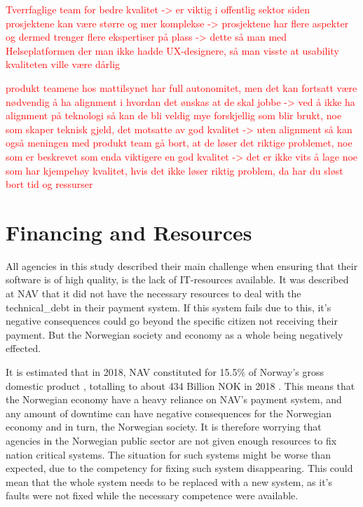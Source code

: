 \textcolor{red}{Tverrfaglige team  for bedre kvalitet -> er viktig i offentlig sektor siden prosjektene kan være større og mer komplekse -> prosjektene har flere aspekter og dermed trenger flere ekspertiser på plass -> dette så man med Helseplatformen der man ikke hadde UX-designere, så man visste at usability kvaliteten ville være dårlig}

\textcolor{red}{produkt teamene hos mattilsynet har full autonomitet, men det kan fortsatt være nødvendig å ha alignment i hvordan det ønskas at de skal jobbe -> ved å ikke ha alignment på teknologi så kan de bli veldig mye forskjellig som blir brukt, noe som skaper teknisk gjeld, det motsatte av god kvalitet -> uten alignment så kan også meningen med produkt team gå bort, at de løser det riktige problemet, noe som er beskrevet som enda viktigere en god kvalitet -> det er ikke vits å lage noe som har kjempehøy kvalitet, hvis det ikke løser riktig problem, da har du sløst bort tid og ressurser}

\section{Financing and Resources}
All agencies in this study described their main challenge when ensuring that their software is of high quality, is the lack of IT-resources available. It was described at NAV that it did not have the necessary resources to deal with the \gls{technical_debt} in their payment system. If this system fails due to this, it's negative consequences could go beyond the specific citizen not receiving their payment. But the Norwegian society and economy as a whole being negatively effected. 

It is estimated that in 2018, NAV constituted for 15.5\% of Norway's gross domestic product \cite{nav_ytelsene_frem_mot_2060_2019}, totalling to about 434 Billion NOK in 2018 \cite{faktaark_finansdepartementet_2020}. This means that the Norwegian economy have a heavy reliance on NAV's payment system, and any amount of downtime can have negative consequences for the Norwegian economy and in turn, the Norwegian society. It is therefore worrying that agencies in the Norwegian public sector are not given enough resources to fix nation critical systems. The situation for such systems might be worse than expected, due to the competency for fixing such system disappearing. This could mean that the whole system needs to be replaced with a new system, as it's faults were not fixed while the necessary competence were available.

